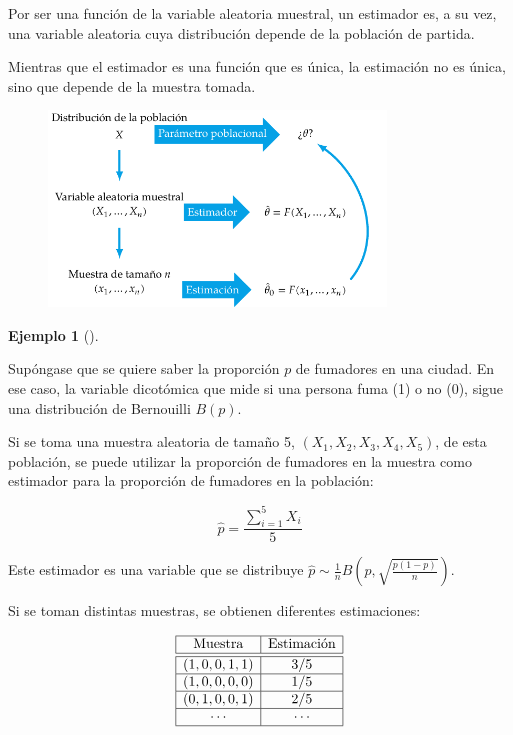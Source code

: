 \documentclass[
  a4paper,
]{scrreport}
\theoremstyle{plain}
\theoremstyle{definition}
\newtheorem{example}{Ejemplo}[chapter]
\theoremstyle{definition}
\theoremstyle{remark}
\begin{document}
Por ser una función de la variable aleatoria muestral, un estimador es,
a su vez, una variable aleatoria cuya distribución depende de la
población de partida.

Mientras que el estimador es una función que es única, la estimación no
es única, sino que depende de la muestra tomada.

\begin{figure}

{\centering \includegraphics[width=0.8\textwidth,height=\textheight]{img/estimacion/estimador-estimacion.pdf}

}

\end{figure}

\begin{example}[]\protect\hypertarget{exm-estimacion-fumadores}{}\label{exm-estimacion-fumadores}

Supóngase que se quiere saber la proporción \(p\) de fumadores en una
ciudad. En ese caso, la variable dicotómica que mide si una persona fuma
(1) o no (0), sigue una distribución de Bernouilli \(B(p)\).

Si se toma una muestra aleatoria de tamaño 5, \((X_1,X_2,X_3,X_4,X_5)\),
de esta población, se puede utilizar la proporción de fumadores en la
muestra como estimador para la proporción de fumadores en la población:

\[
\hat p = \frac{\sum_{i=1}^5 X_i}{5}
\]

Este estimador es una variable que se distribuye
\(\hat p\sim \frac{1}{n}B\left(p,\sqrt{\frac{p(1-p)}{n}}\right)\).

Si se toman distintas muestras, se obtienen diferentes estimaciones:

\[
\begin{array}{|c|c|}
\hline
\mbox{Muestra} & \mbox{Estimación}\\
\hline\hline
(1, 0, 0, 1, 1) & 3/5\\
\hline
(1, 0, 0, 0, 0) & 1/5\\
\hline
(0, 1, 0, 0, 1) & 2/5\\
\hline
\cdots & \cdots\\
\hline
\end{array}
\]

\end{example}
\end{document}
